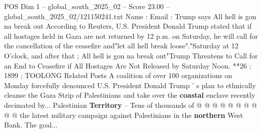 \begin{textsample}{POS Dim 1 – global\_south\_2025\_02 – Score 23.00 – global\_south\_2025\_02/121150241.txt}
Name : Email : Trump says All hell is gon na break out According to Reuters, U.S.
President Donald Trump stated that if all hostages held in Gaza are not returned by 12 p.m. on Saturday, he will call for the cancellation of the ceasefire and"let all hell break loose"."Saturday at 12 O'clock, and after that ; All hell is gon na break out"Trump Threatens to Call for an End to Ceasefire if All Hostages Are Not Released by Saturday Noon. **26 ; 1899 ; TOOLONG Related Posts A coalition of over 100 organizations on Monday forcefully denounced U.S.
President Donald Trump ' s plan to ethnically cleanse the Gaza Strip of Palestinians and take over the \textbf{coastal} enclave recently decimated by...
Palestinian \textbf{Territory} -- Tens of thousands of @ @ @ @ @ @ @ @ @ @ the latest military campaign against Palestinians in the \textbf{northern} West Bank.
The goal...

\end{textsample}
